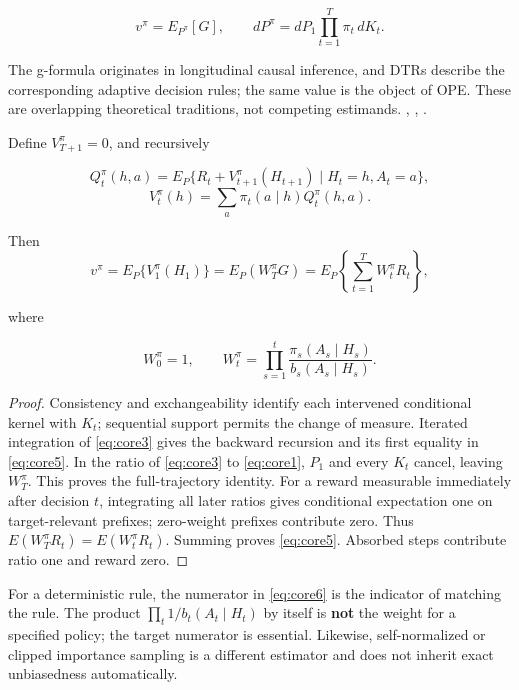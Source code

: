 \begin{equation}\label{eq:core3}
v^\pi=E_{P^\pi}[G],\qquad
dP^\pi=dP_1\prod_{t=1}^{T}\pi_t\,dK_t.
\end{equation}

The g-formula originates in longitudinal causal inference, and DTRs describe the corresponding adaptive decision rules; the same value is the object of OPE. These are overlapping theoretical traditions, not competing estimands. \citep{robins1986new}, \citep{murphy2003optimal}, \citep{jiang2016dr}.

\begin{proposition}\label{core-result-1}
Define \(V_{T+1}^{\pi}=0\), and recursively

\[
Q_t^{\pi}(h,a)=E_P\{R_t+V_{t+1}^{\pi}(H_{t+1})\mid H_t=h,A_t=a\},
\] \begin{equation}\label{eq:core4}
V_t^{\pi}(h)=\sum_a\pi_t(a\mid h)Q_t^{\pi}(h,a).
\end{equation}

Then
\begin{equation}\label{eq:core5}
v^\pi=E_P\{V_1^{\pi}(H_1)\}
=E_P(W_T^{\pi}G)
=E_P\left\{\sum_{t=1}^{T}W_t^{\pi}R_t\right\},
\end{equation}

where

\begin{equation}\label{eq:core6}
W_0^{\pi}=1,\qquad
W_t^{\pi}=\prod_{s=1}^{t}
\frac{\pi_s(A_s\mid H_s)}{b_s(A_s\mid H_s)}.
\end{equation}
\end{proposition}
\begin{proof}
Consistency and exchangeability identify each intervened conditional kernel with \(K_t\); sequential support permits the change of measure. Iterated integration of \eqref{eq:core3} gives the backward recursion and its first equality in \eqref{eq:core5}. In the ratio of \eqref{eq:core3} to \eqref{eq:core1}, \(P_1\) and every \(K_t\) cancel, leaving \(W_T^{\pi}\). This proves the full-trajectory identity. For a reward measurable immediately after decision \(t\), integrating all later ratios gives conditional expectation one on target-relevant prefixes; zero-weight prefixes contribute zero. Thus \(E(W_T^{\pi}R_t)=E(W_t^{\pi}R_t)\). Summing proves \eqref{eq:core5}. Absorbed steps contribute ratio one and reward zero.
\end{proof}

For a deterministic rule, the numerator in \eqref{eq:core6} is the indicator of matching the rule. The product \(\prod_t1/b_t(A_t\mid H_t)\) by itself is \textbf{not} the weight for a specified policy; the target numerator is essential. Likewise, self-normalized or clipped importance sampling is a different estimator and does not inherit exact unbiasedness automatically.

